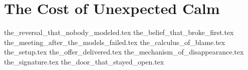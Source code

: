 \section{The Cost of Unexpected Calm}

{the_reversal_that_nobody_modeled.tex}
{the_belief_that_broke_first.tex}
{the_meeting_after_the_models_failed.tex}
{the_calculus_of_blame.tex}
{the_setup.tex}
{the_offer_delivered.tex}
{the_mechanism_of_disappearance.tex}
{the_signature.tex}
{the_door_that_stayed_open.tex}
